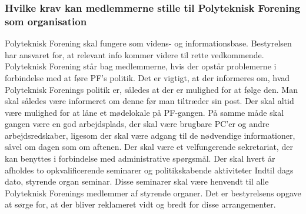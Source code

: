 \subsubsection{Hvilke krav kan medlemmerne stille til Polyteknisk Forening som organisation}
Polyteknisk Forening skal fungere som videns- og informationsbase. Bestyrelsen har ansvaret for, at relevant info kommer videre til rette vedkommende. Polyteknisk Forening står bag medlemmerne, hvis der opstår problemerne i forbindelse med at føre PF’s politik. Det er vigtigt, at der informeres om, hvad Polyteknisk Forenings politik er, således at der er mulighed for at følge den. Man skal således være informeret om denne før man tiltræder sin post. Der skal altid være mulighed for at låne et mødelokale på PF-gangen. På samme måde skal gangen være en god arbejdsplads, der skal være brugbare PC'er og andre arbejdsredskaber, ligesom der skal være adgang til de nødvendige informationer, såvel om dagen som om aftenen. Der skal være et velfungerende sekretariat, der kan benyttes i forbindelse med administrative spørgsmål. Der skal hvert år afholdes to opkvalificerende seminarer og politikskabende aktiviteter Indtil dags dato, styrende organ seminar. Disse seminarer skal være henvendt til alle Polyteknisk Forenings medlemmer af styrende organer. Det er bestyrelsens opgave at sørge for, at der bliver reklameret vidt og bredt for disse arrangementer.